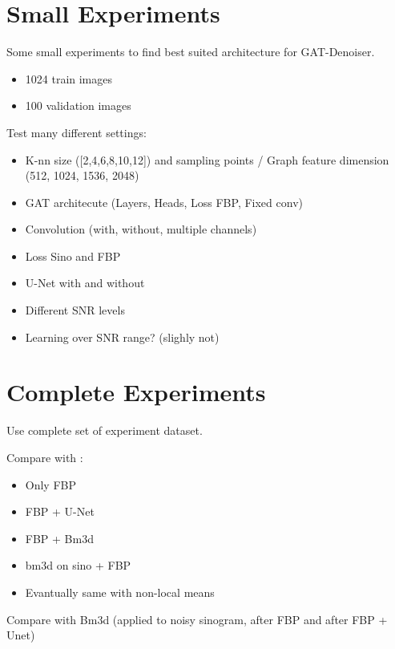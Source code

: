\section{Small Experiments}
Some small experiments to find best suited architecture for GAT-Denoiser.
\begin{itemize}
  \item 1024 train images
  \item 100 validation images
\end{itemize}

Test many different settings:
\begin{itemize}
  \item K-nn size ([2,4,6,8,10,12]) and sampling points / Graph feature dimension (512, 1024, 1536, 2048)
 
  \item GAT architecute (Layers, Heads, Loss FBP, Fixed conv)
  \item Convolution (with, without, multiple channels)
  \item Loss Sino and FBP
  \item U-Net with and without
  \item Different SNR levels
  \item Learning over SNR range? (slighly not)
  
  
\end{itemize}


\section{Complete Experiments}
Use complete set of experiment dataset.

Compare with :
\begin{itemize}
  \item Only FBP
  \item FBP  + U-Net
  \item FBP  + Bm3d
  \item bm3d on sino + FBP
  \item Evantually same with non-local means
\end{itemize}
Compare with Bm3d (applied to noisy sinogram, after FBP and after FBP + Unet)

